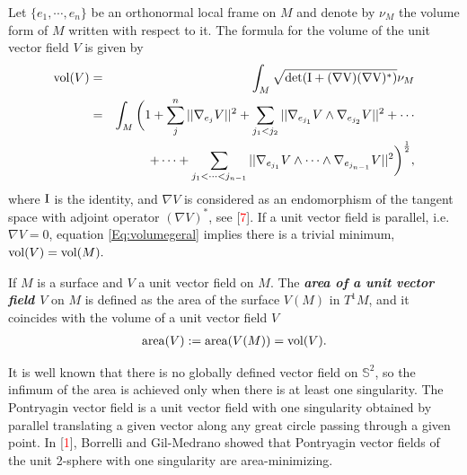 \documentclass[reqno,11pt]{amsart}
\DeclareMathOperator{\vol}{\rm vol}
\DeclareMathOperator{\area}{\rm area}
\begin{document}
\noindent Let $\{e_1,\cdots ,e_n\}$ be an orthonormal local frame on $M$ and denote by $\nu_M$ the volume form of $M$ written with respect to it. The formula for the volume of the unit vector field $V$ is given by
\begin{eqnarray}\label{Eq:volumegeral}\nonumber
\vol( V) & = &\int_{M}{\sqrt{\det(\rm{I}+(\nabla V)(\nabla V)^*)}\nu_M}\\
& = & \int_{M} \bigg(1 + \sum_{j}^{n}||\nabla_{e_j}V||^2 + \sum_{j_1 < j_2}||\nabla_{e_{j_1}}V \wedge \nabla_{e_{j_2}}V||^2 + \cdots \\\nonumber
& &+ \cdots + \sum_{j_1 < \cdots < j_{n-1}}||\nabla_{e_{j_1}}V \wedge \cdots\wedge\nabla_{e_{j_{n-1}}}V||^2\bigg)^{\frac{1}{2}},
\end{eqnarray}
where $\rm{I}$ is the identity, and $\nabla V$ is considered as an endomorphism of the tangent space with adjoint operator $(\nabla V)^*$, see [\textcolor{red}{7}]. If a unit vector field is parallel, i.e. $\nabla V = 0$, equation \eqref{Eq:volumegeral} implies there is a trivial minimum, $\vol(V)=\vol(M).$


\noindent If $M$ is a surface and  $V$ a unit vector field on $M$. The \textit{\textbf{area of a unit vector field $V$}} on $M$ is defined as the area of the surface $V(M)$ in $T^1M$, and it coincides with the volume of a unit vector field $V$
\begin{align*}
    \area(V) := \area(V(M)) = \vol(V).
\end{align*}

\noindent It is well known that there is no globally defined vector field on $\mathbb{S}^2$, so the infimum of the area is achieved only when there is at least one singularity. The Pontryagin vector field is a unit vector field with one singularity obtained by parallel translating a given vector along any great circle passing through a given point. In [\textcolor{red}{1}], Borrelli and Gil-Medrano showed that Pontryagin vector fields of the unit 2-sphere with one singularity are area-minimizing. 
\end{document}
